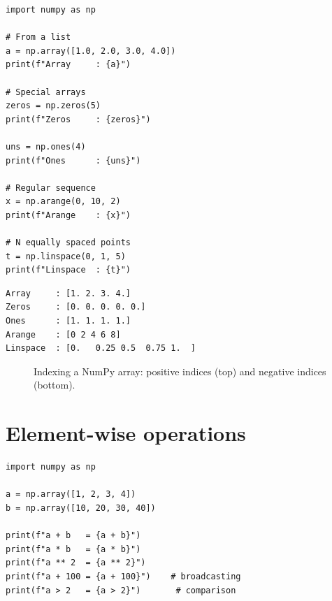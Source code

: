 \begin{codeblock}[title=\textbf{Python}]
\begin{verbatim}
import numpy as np

# From a list
a = np.array([1.0, 2.0, 3.0, 4.0])
print(f"Array     : {a}")

# Special arrays
zeros = np.zeros(5)
print(f"Zeros     : {zeros}")

uns = np.ones(4)
print(f"Ones      : {uns}")

# Regular sequence
x = np.arange(0, 10, 2)
print(f"Arange    : {x}")

# N equally spaced points
t = np.linspace(0, 1, 5)
print(f"Linspace  : {t}")
\end{verbatim}
\end{codeblock}

\begin{codeoutput}
\begin{verbatim}
Array     : [1. 2. 3. 4.]
Zeros     : [0. 0. 0. 0. 0.]
Ones      : [1. 1. 1. 1.]
Arange    : [0 2 4 6 8]
Linspace  : [0.   0.25 0.5  0.75 1.  ]
\end{verbatim}
\end{codeoutput}

\begin{figure}[ht]
\centering
{}
\caption{Indexing a NumPy array: positive indices (top) and negative indices (bottom).}
\label{fig:numpy-indexation}
\end{figure}

\section{Element-wise operations}

\begin{codeblock}[title=\textbf{Python}]
\begin{verbatim}
import numpy as np

a = np.array([1, 2, 3, 4])
b = np.array([10, 20, 30, 40])

print(f"a + b   = {a + b}")
print(f"a * b   = {a * b}")
print(f"a ** 2  = {a ** 2}")
print(f"a + 100 = {a + 100}")    # broadcasting
print(f"a > 2   = {a > 2}")       # comparison
\end{verbatim}
\end{codeblock}

